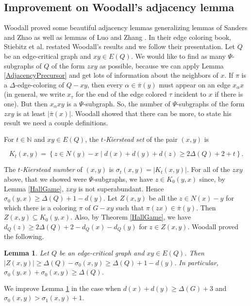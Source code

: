 \documentclass[12pt,reqno]{amsart}
\theoremstyle{plain}
\newtheorem{lem}[thm]{Lemma}
\theoremstyle{definition}
\theoremstyle{remark}
\newcommand{\IN}{\mathbb{N}}
\newcommand{\setb}[3]{\left\{ #1 \in #2 \mid #3 \right\}}
\newcommand{\card}[1]{\left|#1\right|}
\begin{document}
\subsection{Improvement on Woodall's adjacency lemma}

Woodall \cite{woodall2007average} proved some beautiful adjacency lemmas generalizing lemmas of Sanders and Zhao \cite{sanders2001planar} as well as lemmas of Luo and Zhang \cite{luo2004edge}.
In their edge coloring book, Stiebitz et al. \cite{stiebitz2012graph} restated Woodall's results and we follow their presentation.  Let $Q$ be an edge-critical graph and $xy \in E(Q)$.  We would like to find as many $\Psi$-subgraphs of $Q$ of the form $zxy$ as possible, because we can apply Lemma \ref{AdjacencyPrecursor} and get lots of information about the neighbors of $x$. If $\pi$ is a $\Delta$-edge-coloring of $Q - xy$, then every $\alpha \in \bar{\pi}(y)$ must appear on an edge $x_\alpha x$ (in general, we write $x_\tau$ for the end of the edge colored $\tau$ incident to $x$ if there is one).  But then $x_\alpha xy$ is a $\Psi$-subgraph.  So, the number of $\Psi$-subgraphs of the form $zxy$ is at least $\card{\bar{\pi}(x)}$.  Woodall showed that there can be more, to state his result we need a couple definitions.

For $t \in \IN$ and $xy \in E(Q)$, the \emph{$t$-Kierstead set} of the pair $(x,y)$ is 

\[K_t(x,y) = \setb{z}{N(y) - x}{d(x) + d(y) + d(z) \ge 2\Delta(Q) + 2 + t}.\] 

\noindent The \emph{$t$-Kierstead number} of $(x,y)$ is $\sigma_t(x,y) = \card{K_t(x,y)}$.  For all of the $zxy$ above, that we showed were $\Psi$-subgraphs, we have $z \in K_0(y,x)$ since, by Lemma \ref{HallGame}, $zxy$ is not superabundant.  Hence $\sigma_0(y,x) \ge \Delta(Q) + 1 - d(y)$. Let $Z(x, y)$ be all the $z \in N(x) - y$ for which there is a coloring $\pi$ of $G-xy$ such that $\pi(zx) \in \bar{\pi}(y)$.  Then $Z(x, y) \subseteq K_0(y, x)$.
Also, by Theorem \ref{HallGame}, we have $d_Q(z) \ge 2\Delta(Q) + 2 - d_Q(x) - d_Q(y)$ for $z \in Z(x, y)$.  Woodall proved the following.

\begin{lem}\label{WoodallLotsOfPsiSubgraphs}
Let $Q$ be an edge-critical graph and $xy \in E(Q)$.  Then $\card{Z(x, y)} \ge \Delta(Q) - \sigma_0(x, y) \ge \Delta(Q) + 1 - d(y)$.  In particular, $\sigma_0(y,x) + \sigma_0(x,y) \ge \Delta(Q)$.  
\end{lem}

We improve Lemma \ref{WoodallLotsOfPsiSubgraphs} in the case when $d(x) + d(y) \ge \Delta(G) + 3$ and $\sigma_0(x, y) > \sigma_1(x, y) + 1$.
\end{document}

